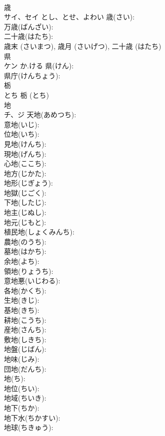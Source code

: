 \documentclass[8pt]{extreport}
\begin{document}
\begin{CJK}{UTF8}{min}
\\	歳		
\\	サイ、セイ	とし、とせ、よわい	歳(さい): 
\\	万歳(ばんざい): 
\\	二十歳(はたち): 
\\	歳末 (さいまつ), 歳月 (さいげつ), 二十歳 (はたち)
\\	県		
\\	ケン	か.ける	県(けん): 
\\	県庁(けんちょう): 
\\	栃		
\\	とち		栃 (とち)
\\	地		
\\	チ、ジ		天地(あめつち): 
\\	意地(いじ): 
\\	位地(いち): 
\\	見地(けんち): 
\\	現地(げんち): 
\\	心地(ここち): 
\\	地方(じかた): 
\\	地形(じぎょう): 
\\	地獄(じごく): 
\\	下地(したじ): 
\\	地主(じぬし): 
\\	地元(じもと): 
\\	植民地(しょくみんち): 
\\	農地(のうち): 
\\	墓地(はかち): 
\\	余地(よち): 
\\	領地(りょうち): 
\\	意地悪(いじわる): 
\\	各地(かくち): 
\\	生地(きじ): 
\\	基地(きち): 
\\	耕地(こうち): 
\\	産地(さんち): 
\\	敷地(しきち): 
\\	地盤(じばん): 
\\	地味(じみ): 
\\	団地(だんち): 
\\	地(ち): 
\\	地位(ちい): 
\\	地域(ちいき): 
\\	地下(ちか): 
\\	地下水(ちかすい): 
\\	地球(ちきゅう): 

\end{CJK}
\end{document}
